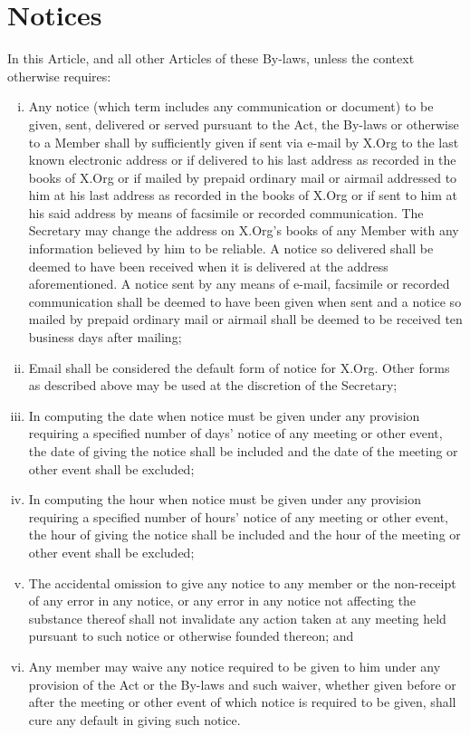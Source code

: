 \documentclass[10pt, english]{xorgdocs}
\begin{document}
\section{Notices}
In this Article, and all other Articles of these By-laws, unless the context
otherwise requires:

\begin{enumerate}[(i)\hspace{.2cm}]
	\item Any notice (which term includes any communication or document) to
	be given, sent, delivered or served pursuant to the Act, the By-laws or
	otherwise to a Member shall by sufficiently given if sent via e-mail by
	X.Org to the last known electronic address or if delivered to his last
	address as recorded in the books of X.Org or if mailed by prepaid
	ordinary mail or airmail addressed to him at his last address as
	recorded in the books of X.Org or if sent to him at his said address by
	means of facsimile or recorded communication. The Secretary may change
	the address on X.Org's books of any Member with any information believed
	by him to be reliable. A notice so delivered shall be deemed to have
	been received when it is delivered at the address aforementioned. A notice
	sent by any means of e-mail, facsimile or recorded communication shall
	be deemed to have been given when sent and a notice so mailed by
	prepaid ordinary mail or airmail shall be deemed to be received ten
	business days after mailing;

	\item Email shall be considered the default form of notice for X.Org.
	Other forms as described above may be used at the discretion of the
	Secretary;

	\item In computing the date when notice must be given under any
	provision requiring a specified number of days' notice of any meeting or
	other event, the date of giving the notice shall be included and the
	date of the meeting or other event shall be excluded;

	\item In computing the hour when notice must be given under any
	provision requiring a specified number of hours' notice of any meeting
	or other event, the hour of giving the notice shall be included and the
	hour of the meeting or other event shall be excluded;

	\item The accidental omission to give any notice to any member or the
	non-receipt of any error in any notice, or any error in any notice not
	affecting the substance thereof shall not invalidate any action taken at
	any meeting held pursuant to such notice or otherwise founded thereon;
	and

	\item Any member may waive any notice required to be given to him under
	any provision of the Act or the By-laws and such waiver, whether given
	before or after the meeting or other event of which notice is required
	to be given, shall cure any default in giving such notice.
\end{enumerate}
\end{document}
